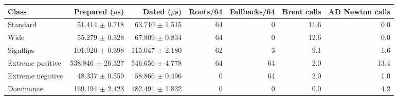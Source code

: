\begin{tabular}{lrrrrrr}
\toprule
Class & Prepared ($\mu$s) & Dated ($\mu$s) & Roots/64 & Fallbacks/64 & Brent calls & AD Newton calls \\
\midrule
Standard & 51.414 $\pm$ 0.718 & 63.710 $\pm$ 1.515 & 64 & 0 & 11.6 & 0.0 \\
Wide & 55.279 $\pm$ 0.328 & 67.809 $\pm$ 0.834 & 64 & 0 & 12.6 & 0.0 \\
Signflips & 101.920 $\pm$ 0.398 & 115.047 $\pm$ 2.180 & 62 & 3 & 9.1 & 1.6 \\
Extreme positive & 538.846 $\pm$ 26.327 & 546.656 $\pm$ 4.778 & 64 & 64 & 2.0 & 13.4 \\
Extreme negative & 48.337 $\pm$ 0.559 & 58.866 $\pm$ 0.496 & 0 & 64 & 2.0 & 1.0 \\
Dominance & 169.194 $\pm$ 2.423 & 182.491 $\pm$ 1.832 & 0 & 0 & 0.0 & 4.2 \\
\bottomrule
\end{tabular}
